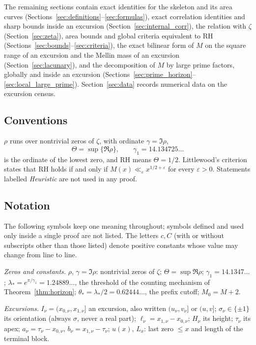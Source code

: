 \documentclass[11pt]{amsart}
\numberwithin{equation}{section}
\theoremstyle{plain}
\theoremstyle{definition}
\theoremstyle{remark}
\newcommand{\eps}{\varepsilon}
\begin{document}
\smallskip
The remaining sections contain exact identities for the skeleton and its area
curves (Sections~\ref{sec:definitions}--\ref{sec:formulas}), exact
correlation identities and sharp bounds inside an excursion
(Section~\ref{sec:internal_corr}), the relation with $\zeta$
(Section~\ref{sec:zeta}), area bounds and global criteria equivalent to RH
(Sections~\ref{sec:bounds}--\ref{sec:criteria}), the exact bilinear form of
$M$ on the square range of an excursion and the Mellin mass of an excursion
(Section~\ref{sec:lacunary}), and the decomposition of $M$ by large prime
factors, globally and inside an excursion
(Sections~\ref{sec:prime_horizon}--\ref{sec:local_large_prime}).
Section~\ref{sec:data} records numerical data on the excursion census.

\subsection*{Conventions}
$\rho$ runs over nontrivial zeros of $\zeta$, with ordinate $\gamma=\Im\rho$,
\[
\Theta=\sup\{\Re\rho\},\qquad \gamma_1=14.134725\ldots
\]
is the ordinate of the lowest zero, and RH means $\Theta=1/2$. Littlewood's
criterion \cite[\S14.25]{Titchmarsh1986} states that RH holds if and only if
$M(x)\ll_\eps x^{1/2+\eps}$ for every $\eps>0$. Statements labelled
\emph{Heuristic} are not used in any proof.

\subsection*{Notation}
\label{subsec:notation}
The following symbols keep one meaning throughout; symbols defined and used
only inside a single proof are not listed. The letters $c,C$ (with or without
subscripts other than those listed) denote positive constants whose value may
change from line to line.

\smallskip
\noindent\emph{Zeros and constants.}
$\rho$, $\gamma=\Im\rho$: nontrivial zeros of $\zeta$;
$\Theta=\sup\Re\rho$;
$\gamma_1=14.1347\ldots$;
$\lambda_*=e^{\pi/\gamma_1}=1.24889\ldots$, the threshold of the counting
mechanism of Theorem~\ref{thm:horizon};
$\theta_*=\lambda_*/2=0.62444\ldots$, the prefix cutoff;
$M_0=M+2$.

\smallskip
\noindent\emph{Excursions.}
$I_\nu=(x_{0,\nu},x_{1,\nu}]$ an excursion, also written $(u_\nu,v_\nu]$ or
$(u,v]$; $\sigma_\nu\in\{\pm1\}$ its orientation (always $\sigma$, never a
real part); $\ell_\nu=x_{1,\nu}-x_{0,\nu}$; $H_\nu$ its height; $\tau_\nu$ its
apex; $a_\nu=\tau_\nu-x_{0,\nu}$, $b_\nu=x_{1,\nu}-\tau_\nu$;
$u(x)$, $L_x$: last zero $\le x$ and length of the terminal block.
\end{document}
